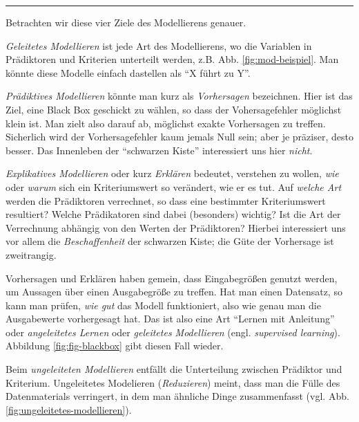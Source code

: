 \documentclass[12pt,ngerman,]{book}
\begin{document}
\begin{center}\rule{0.5\linewidth}{\linethickness}\end{center}

Betrachten wir diese vier Ziele des Modellierens genauer.

\emph{Geleitetes Modellieren} ist jede Art
des Modellierens, wo die Variablen in Prädiktoren und Kriterien
unterteilt werden, z.B. Abb. \ref{fig:mod-beispiel}. Man könnte diese
Modelle einfach dastellen als ``X führt zu Y''.

\emph{Prädiktives Modellieren} könnte man
kurz als \emph{Vorhersagen} bezeichnen. Hier ist das
Ziel, eine Black Box geschickt zu wählen, so dass der Vohersagefehler
möglichst klein ist. Man zielt also darauf ab, möglichst exakte
Vorhersagen zu treffen. Sicherlich wird der Vorhersagefehler kaum jemals
Null sein; aber je präziser, desto besser. Das Innenleben der
``schwarzen Kiste'' interessiert uns hier \emph{nicht}.

\emph{Explikatives Modellieren} oder
kurz \emph{Erklären} bedeutet, verstehen zu wollen,
\emph{wie} oder \emph{warum} sich ein Kriteriumswert so verändert, wie
er es tut. Auf \emph{welche Art} werden die Prädiktoren verrechnet, so
dass eine bestimmter Kriteriumswert resultiert? Welche Prädikatoren sind
dabei (besonders) wichtig? Ist die Art der Verrechnung abhängig von den
Werten der Prädiktoren? Hierbei interessiert uns vor allem die
\emph{Beschaffenheit} der schwarzen Kiste; die Güte der Vorhersage ist
zweitrangig.

Vorhersagen und Erklären haben gemein, dass Eingabegrößen genutzt
werden, um Aussagen über einen Ausgabegröße zu treffen. Hat man einen
Datensatz, so kann man prüfen, \emph{wie gut} das Modell funktioniert,
also wie genau man die Ausgabewerte vorhergesagt hat. Das ist also eine
Art ``Lernen mit Anleitung'' oder \emph{angeleitetes
Lernen} oder \emph{geleitetes Modellieren}
(engl. \emph{supervised learning}). Abbildung \ref{fig:fig-blackbox}
gibt diesen Fall wieder.

Beim \emph{ungeleiteten Modellieren}
entfällt die Unterteilung zwischen Prädiktor und Kriterium. Ungeleitetes
Modelieren (\emph{Reduzieren}) meint, dass man die
Fülle des Datenmaterials verringert, in dem man ähnliche Dinge
zusammenfasst (vgl. Abb. \ref{fig:ungeleitetes-modellieren}).
\end{document}
